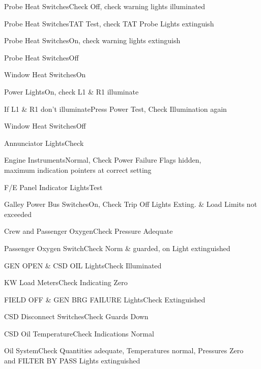 \documentclass[sim-use, blue_items]{checklist}
\begin{document}
\begin{continuedchecklist}
	 {
		\item{Probe Heat Switches}{Check Off, check warning lights illuminated}
		\item{Probe Heat Switches}{TAT Test, check TAT Probe Lights extinguish}
		\item{Probe Heat Switches}{On, check warning lights extinguish}
		\item{Probe Heat Switches}{Off}
	}
	 {
		\item{Window Heat Switches}{On}
		\item{Power Lights}{On, check L1 \& R1 illuminate}
		\item{If L1 \& R1 don't illuminate}{Press Power Test, Check Illumination again}
		\item{Window Heat Switches}{Off}
	}
	\item{Annunciator Lights}{Check} %
	\item{Engine Instruments}{Normal, Check Power Failure Flags hidden,\\maximum indication pointers at correct setting}
	\item{F/E Panel Indicator Lights}{Test}
	\item{Galley Power Bus Switches}{On, Check Trip Off Lights Exting. \& Load Limits not exceeded}
	\item{Crew and Passenger Oxygen}{Check Pressure Adequate} %
	\item{Passenger Oxygen Switch}{Check Norm \& guarded, on Light extinguished}
	 {
		\item{GEN OPEN \& CSD OIL Lights}{Check Illuminated} %
		\item{KW Load Meters}{Check Indicating Zero}
		\item{FIELD OFF \& GEN BRG FAILURE Lights}{Check Extinguished}
		\item{CSD Disconnect Switches}{Check Guards Down}
		\item{CSD Oil Temperature}{Check Indications Normal}
	}
	\item{Oil System}{Check Quantities adequate, Temperatures normal, Pressures Zero\\and FILTER BY PASS Lights extinguished}
\end{continuedchecklist}
\end{document}
